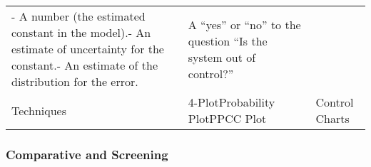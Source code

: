 \documentclass[]{book}
\theoremstyle{definition}
\theoremstyle{definition}
\theoremstyle{definition}
\theoremstyle{remark}
\begin{document}
\begin{longtable}[]{@{}lll@{}}
\begin{minipage}[t]{0.39\columnwidth}
- A number (the estimated constant in the model).- An estimate of
uncertainty for the constant.- An estimate of the distribution for the
error.\strut
\end{minipage} & \begin{minipage}[t]{0.39\columnwidth}\raggedright\strut
A ``yes'' or ``no'' to the question ``Is the system out of
control?''\strut
\end{minipage}\tabularnewline
\begin{minipage}[t]{0.14\columnwidth}\raggedright\strut
Techniques\strut
\end{minipage} & \begin{minipage}[t]{0.39\columnwidth}\raggedright\strut
4-PlotProbability PlotPPCC Plot\strut
\end{minipage} & \begin{minipage}[t]{0.39\columnwidth}\raggedright\strut
Control Charts\strut
\end{minipage}\tabularnewline
\bottomrule
\end{longtable}

\subsubsection{Comparative and
Screening}\label{comparative-and-screening}
\end{document}
